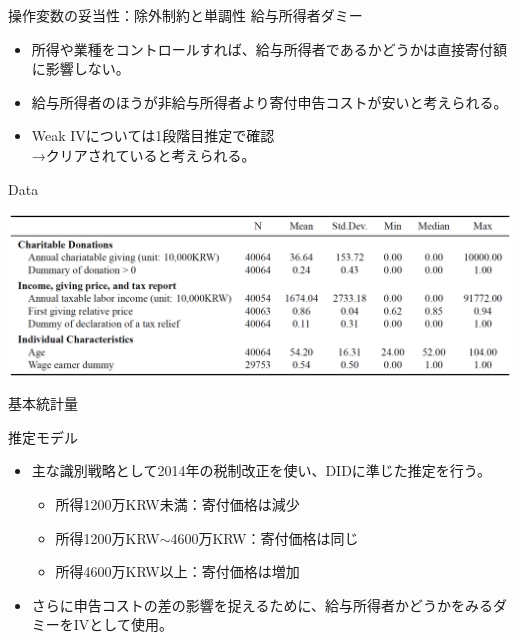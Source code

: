 \documentclass[dvipdfmx,10pt]{beamer}
\begin{document}
\begin{frame}{操作変数の妥当性：除外制約と単調性}
給与所得者ダミー
	\begin{itemize}
		\item 所得や業種をコントロールすれば、給与所得者であるかどうかは直接寄付額に影響しない。
		\item 給与所得者のほうが非給与所得者より寄付申告コストが安いと考えられる。
		\item Weak IVについては1段階目推定で確認\\
→クリアされていると考えられる。
\end{itemize}
\end{frame}








\begin{frame}{Data}
	\begin{table}
		\centering
		\includegraphics[width=0.9\linewidth]{Tab_Stat}
		\caption{基本統計量}
		\label{tab:1}
	\end{table}
\end{frame}

\begin{frame}{推定モデル}
\begin{itemize}
	\item 主な識別戦略として2014年の税制改正を使い、DIDに準じた推定を行う。
	\begin{itemize}
		\item 所得1200万KRW未満：寄付価格は減少
		\item 所得1200万KRW$\sim$4600万KRW：寄付価格は同じ
		\item 所得4600万KRW以上：寄付価格は増加
	\end{itemize}
	\item さらに申告コストの差の影響を捉えるために、給与所得者かどうかをみるダミーをIVとして使用。
\end{itemize}
\end{frame}
\end{document}
